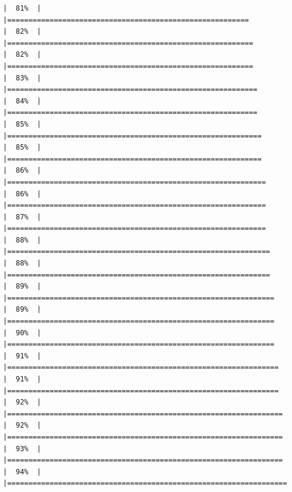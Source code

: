 \documentclass[
  english,
  man,a4paper,mask,floatsintext]{apa6}
\begin{document}
\begin{verbatim}
|  81%  |                                                                              |=========================================================             |  82%  |                                                                              |==========================================================            |  82%  |                                                                              |==========================================================            |  83%  |                                                                              |===========================================================           |  84%  |                                                                              |===========================================================           |  85%  |                                                                              |============================================================          |  85%  |                                                                              |============================================================          |  86%  |                                                                              |=============================================================         |  86%  |                                                                              |=============================================================         |  87%  |                                                                              |=============================================================         |  88%  |                                                                              |==============================================================        |  88%  |                                                                              |==============================================================        |  89%  |                                                                              |===============================================================       |  89%  |                                                                              |===============================================================       |  90%  |                                                                              |===============================================================       |  91%  |                                                                              |================================================================      |  91%  |                                                                              |================================================================      |  92%  |                                                                              |=================================================================     |  92%  |                                                                              |=================================================================     |  93%  |                                                                              |=================================================================     |  94%  |                                                                              |==================================================================    
\end{verbatim}
\end{document}
